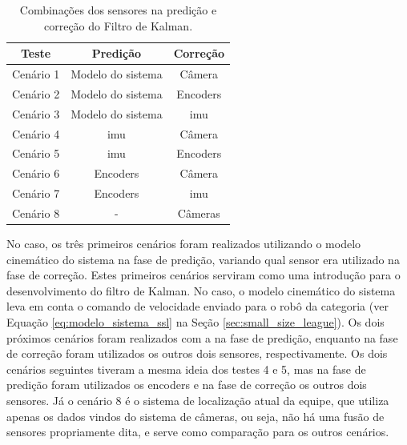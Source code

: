 \documentclass[acronym, symbols, table, deposito]{fei}
\begin{document}
		\begin{table}[!htb]
			\centering
			\caption{Combinações dos sensores na predição e correção do Filtro de Kalman.}
			\label{tbl:combinacao_sensores}
			\begin{tabular}{|c|c|c|}
				\hline
				\textbf{Teste}   & \textbf{Predição} & \textbf{Correção} \\ \hline
				Cenário 1 		 & Modelo do sistema & Câmera   		 \\ \hline
				Cenário 2 		 & Modelo do sistema & Encoders 		 \\ \hline
				Cenário 3 		 & Modelo do sistema & \acrshort{imu} 	 \\ \hline
				Cenário 4 		 & \acrshort{imu}    & Câmera   		 \\ \hline
				Cenário 5 		 & \acrshort{imu}    & Encoders 		 \\ \hline
				Cenário 6 		 & Encoders          & Câmera   		 \\ \hline
				Cenário 7 		 & Encoders          & \acrshort{imu} 	 \\ \hline
				Cenário 8 		 & - 			 	 & Câmeras 			 \\ \hline
			\end{tabular}
		\end{table}
		
		No caso, os três primeiros cenários foram realizados utilizando o modelo cinemático do sistema na fase de predição, variando qual sensor era utilizado na fase de correção. Estes primeiros cenários serviram como uma introdução para o desenvolvimento do filtro de Kalman. No caso, o modelo cinemático do sistema leva em conta o comando de velocidade enviado para o robô da categoria  (ver Equação \eqref{eq:modelo_sistema_ssl} na Seção \ref{sec:small_size_league}). Os dois próximos cenários foram realizados com a  na fase de predição, enquanto na fase de correção foram utilizados os outros dois sensores, respectivamente. Os dois cenários seguintes tiveram a mesma ideia dos testes 4 e 5, mas na fase de predição foram utilizados os encoders e na fase de correção os outros dois sensores. Já o cenário 8 é o sistema de localização atual da equipe, que utiliza apenas os dados vindos do sistema de câmeras, ou seja, não há uma fusão de sensores propriamente dita, e serve como comparação para os outros cenários.
		
\end{document}
